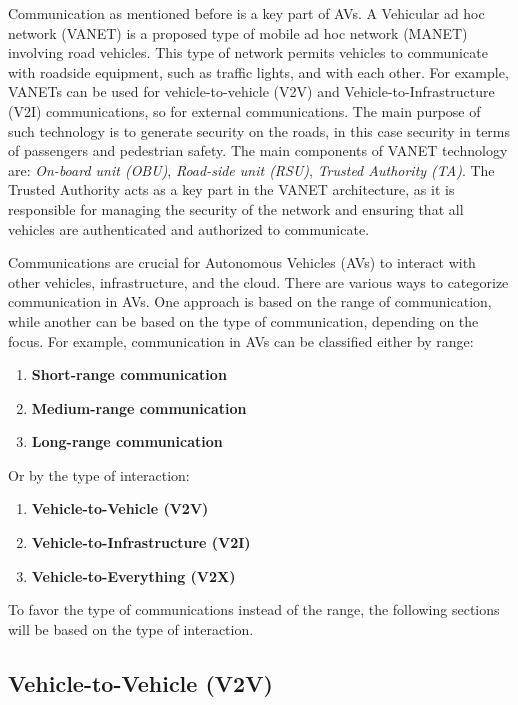 Communication as mentioned before is a key part of AVs.
A Vehicular ad hoc network (VANET) is a proposed type of mobile ad hoc network (MANET) involving road vehicles.
This type of network permits vehicles to communicate with roadside equipment, such as traffic lights, and with each other\cite{sheikh2019comprehensive}.
For example, VANETs can be used for vehicle-to-vehicle (V2V) and Vehicle-to-Infrastructure (V2I) communications, so for external communications.
The main purpose of such technology is to generate security on the roads, in this case security in terms of passengers and pedestrian safety.
The main components of VANET technology are: \textit{On-board unit (OBU)}, \textit{Road-side unit (RSU)}, \textit{Trusted Authority (TA)}.
The Trusted Authority acts as a key part in the VANET architecture,
as it is responsible for managing the security of the network and ensuring that all vehicles are authenticated
and authorized to communicate.

Communications are crucial for Autonomous Vehicles (AVs) to interact with other vehicles, infrastructure, and the cloud.
There are various ways to categorize communication in AVs. One approach is based on the range of communication, while another can be based on the type of communication, depending on the focus.
For example, communication in AVs can be classified either by range:
\begin{enumerate}
    \item \textbf{Short-range communication}
    \item \textbf{Medium-range communication}
    \item \textbf{Long-range communication}
\end{enumerate}

Or by the type of interaction:
\begin{enumerate}
    \item \textbf{Vehicle-to-Vehicle (V2V)}
    \item \textbf{Vehicle-to-Infrastructure (V2I)}
    \item \textbf{Vehicle-to-Everything (V2X)}
\end{enumerate}

To favor the type of communications instead of the range, the following sections will be based on the type of interaction.

\subsection{Vehicle-to-Vehicle (V2V)}\label{subsec:vehicle-to-vehicle-(v2v)}

